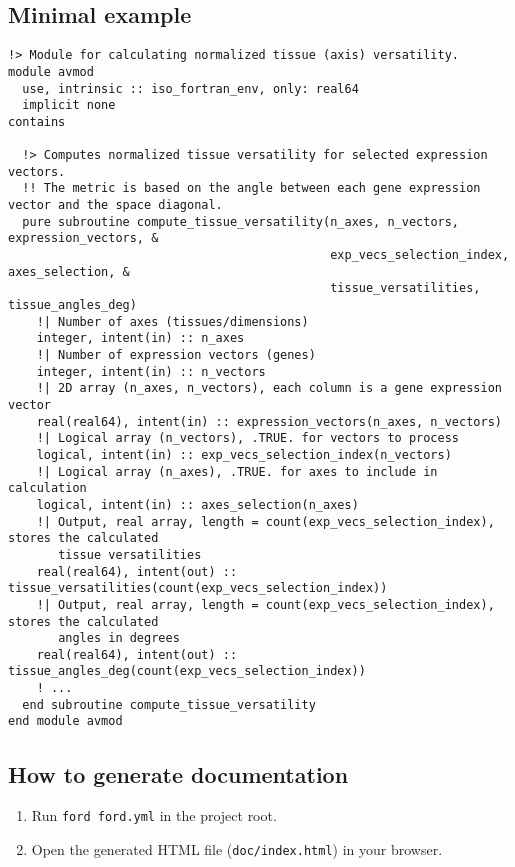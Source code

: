 \documentclass{article}
\begin{document}
\subsection{Minimal example}
\begin{verbatim}
!> Module for calculating normalized tissue (axis) versatility.
module avmod
  use, intrinsic :: iso_fortran_env, only: real64
  implicit none
contains

  !> Computes normalized tissue versatility for selected expression vectors.
  !! The metric is based on the angle between each gene expression vector and the space diagonal.
  pure subroutine compute_tissue_versatility(n_axes, n_vectors, expression_vectors, &
                                             exp_vecs_selection_index, axes_selection, &
                                             tissue_versatilities, tissue_angles_deg)
    !| Number of axes (tissues/dimensions)
    integer, intent(in) :: n_axes
    !| Number of expression vectors (genes)
    integer, intent(in) :: n_vectors
    !| 2D array (n_axes, n_vectors), each column is a gene expression vector
    real(real64), intent(in) :: expression_vectors(n_axes, n_vectors)
    !| Logical array (n_vectors), .TRUE. for vectors to process
    logical, intent(in) :: exp_vecs_selection_index(n_vectors)
    !| Logical array (n_axes), .TRUE. for axes to include in calculation
    logical, intent(in) :: axes_selection(n_axes)
    !| Output, real array, length = count(exp_vecs_selection_index), stores the calculated 
       tissue versatilities
    real(real64), intent(out) :: tissue_versatilities(count(exp_vecs_selection_index))
    !| Output, real array, length = count(exp_vecs_selection_index), stores the calculated 
       angles in degrees
    real(real64), intent(out) :: tissue_angles_deg(count(exp_vecs_selection_index))
    ! ...
  end subroutine compute_tissue_versatility
end module avmod
\end{verbatim}

\subsection{How to generate documentation}
\begin{enumerate}
  \item Run \texttt{ford ford.yml} in the project root.
  \item Open the generated HTML file (\texttt{doc/index.html}) in your browser.
\end{enumerate}
\end{document}
